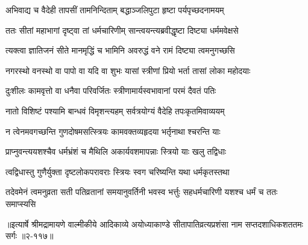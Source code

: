 \twolineshloka
{अभिवाद्य च वैदेही तापसीं तामनिन्दिताम्}
{बद्धाञ्जलिपुटा हृष्टा पर्यपृच्छदनामयम्} %

\twolineshloka
{ततः सीतां महाभागां दृष्ट्वा तां धर्मचारिणीम्}
{सान्त्वयन्त्यब्रवीद्धृष्टा दिष्ट्या धर्ममवेक्षसे} %

\twolineshloka
{त्यक्त्वा ज्ञातिजनं सीते मानमृद्धिं च भामिनि}
{अवरुद्धं वने रामं दिष्ट्या त्वमनुगच्छसि} %

\twolineshloka
{नगरस्थो वनस्थो वा पापो वा यदि वा शुभः}
{यासां स्त्रीणां प्रियो भर्ता तासां लोका महोदयाः} %

\twolineshloka
{दुःशीलः कामवृत्तो वा धनैवा परिवर्जितः}
{स्त्रीणामार्यस्वभावानां परमं दैवतं पतिः} %

\twolineshloka
{नातो विशिष्टं पश्यामि बान्धवं विमृशन्त्यहम्}
{सर्वत्रयोग्यं वैदेहि तपःकृतमिवाव्ययम्} %

\twolineshloka
{न त्वेनमवगच्छन्ति गुणदोषमसत्स्त्रियः}
{कामवक्तव्यहृदया भर्तृनाथा श्चरन्ति याः} %

\twolineshloka
{प्राप्नुवन्त्ययशश्चैव धर्मभ्रंशं च मैथिलि}
{अकार्यवशमापन्नाः स्त्रियो याः खलु तद्विधाः} %

\twolineshloka
{त्वद्विधास्तु गुणैर्युक्ता दृष्टलोकपरावराः}
{स्त्रियः स्वग चरिष्यन्ति यथा धर्मकृतस्तथा} %

\twolineshloka
{तदेवमेनं त्वमनुव्रता सती पतिव्रतानां समयानुवर्तिनी}
{भवस्व भर्त्तुः सहधर्मचारिणी यशश्च धर्मं च ततः समाप्स्यसि} %


॥इत्यार्षे श्रीमद्रामायणे वाल्मीकीये आदिकाव्ये अयोध्याकाण्डे सीतापातिव्रत्यप्रशंसा नाम सप्तदशाधिकशततमः सर्गः ॥२-११७॥
